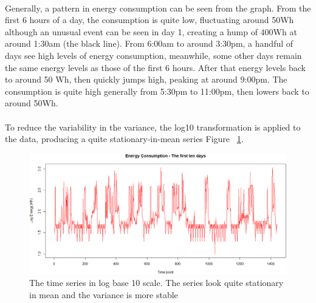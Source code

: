 \documentclass[12pt]{article}
\begin{document}
\paragraph{}
Generally, a pattern in energy consumption can be seen from the graph. From the first 6 hours of a day, the consumption is quite low, fluctuating around 50Wh although an unusual event can be seen in day 1, creating a hump of 400Wh at around 1:30am (the black line). From 6:00am to around 3:30pm, a handful of days see high levels of energy consumption, meanwhile, some other days remain the same energy levels as those of the first 6 hours. After that energy levels back to around 50 Wh, then quickly jumps high, peaking at around 9:00pm. The consumption is quite high generally from 5:30pm to 11:00pm, then lowers back to around 50Wh.

\paragraph{}
To reduce the variability in the variance, the log10 transformation is  applied to the data, producing a quite stationary-in-mean series Figure ~\ref{fig:figure4}.
\begin{figure}[H]
  \includegraphics[width=\linewidth]{figure4.png}
  \caption{The time series in log base 10 scale. The series look quite stationary in mean and the variance is more stable}
  \label{fig:figure4}
\end{figure}
\end{document}
